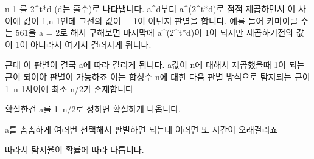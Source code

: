 n-1 를  2^t*d (d는 홀수)로 나타냅니다.
a^d부터 a^(2^t*d)로 점점 제곱하면서 이 사이에 값이 1,n-1인데 그전의 값이 +-1이 아닌지 판별을 합니다.
예를 들어 카마이클 수는 561을 a = 2로 해서 구해보면
마지막에 a^(2^t*d)이 1이 되지만 제곱하기전의 값이 1이 아니라서 여기서 걸러지게 됩니다.


근데 이 판별이 결국 a에 따라 갈리게 됩니다.
a값이 n에 대해서 제곱했을때 1이 되는 근이 되어야 판별이 가능하죠 이는 
합성수 n에 대한 다음 판별 방식으로 탐지되는 근이 1~n-1사이에  최소 n/2가 존재합니다

확실한건 a를 1~n/2로 정하면 확실하게 나옵니다.


a를 촘촘하게 여러번 선택해서 판별하면 되는데 이러면 또 시간이 오래걸리죠

따라서 탐지율이 확률에 따라 다릅니다.